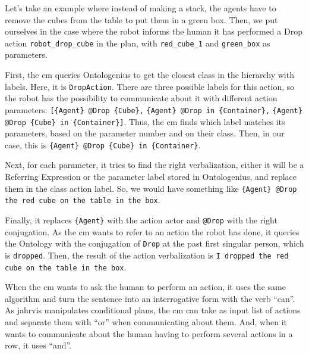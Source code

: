 \documentclass[a4paper,11pt,twoside]{StyleThese}
\begin{document}
Let's take an example where instead of making a stack, the agents have to remove the cubes from the table to put them in a green box. Then, we put ourselves in the case where the robot informs the human it has performed a Drop action \verb'robot_drop_cube' in the plan, with \verb'red_cube_1' and \verb'green_box' as parameters. 

First, the \acrshort{cm} queries Ontologenius to get the closest class in the hierarchy with labels. Here, it is \verb'DropAction'. There are three possible labels for this action, so the robot has the possibility to communicate about it with different action parameters: \verb'[{Agent} @Drop {Cube},' \verb'{Agent} @Drop in {Container},' \verb'{Agent} @Drop {Cube} in {Container}]'. Thus, the \acrshort{cm} finds which label matches its parameters, based on the parameter number and on their class. Then, in our case, this is \verb'{Agent} @Drop {Cube} in {Container}'. 

Next, for each parameter, it tries to find the right verbalization, either it will be a Referring Expression or the parameter label stored in Ontologenius, and replace them in the class action label. So, we would have something like \verb'{Agent} @Drop the red cube on the table in the box'. 

Finally, it replaces \verb'{Agent}' with the action actor and \verb'@Drop' with the right conjugation. As the \acrshort{cm} wants to refer to an action the robot has done, it queries the Ontology with the conjugation of \verb'Drop' at the past first singular person, which is \verb'dropped'. Then, the result of the action verbalization is \verb'I dropped the red cube on the table in the box'. 

When the \acrshort{cm} wants to ask the human to perform an action, it uses the same algorithm and turn the sentence into an interrogative form with the verb ``can''. As \acrshort{jahrvis} manipulates conditional plans, the \acrshort{cm} can take as input list of actions and separate them with ``or'' when communicating about them. And, when it wants to communicate about the human having to perform several actions in a row, it uses ``and''.
 
\end{document}
